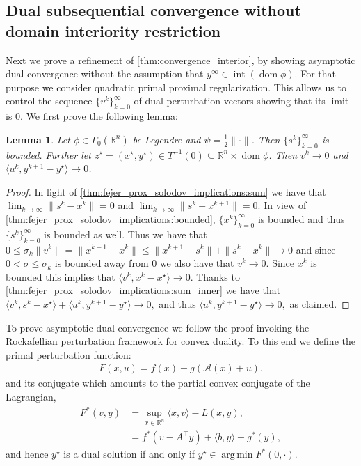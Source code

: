 \documentclass[11pt,onecolumn]{article}
\DeclareMathOperator*{\argmin}{arg\,min}
\DeclareMathOperator{\dom}{dom}
\DeclareMathOperator{\intr}{int}
\newcommand{\bR}{\mathbb{R}}
\newtheorem{lemma}[lemma]{Lemma}
\theoremstyle{remark}
\begin{document}
\subsection{Dual subsequential convergence without domain interiority restriction}
Next we prove a refinement of \cref{thm:convergence_interior}, by showing asymptotic dual convergence without the assumption that $y^\infty \in \intr (\dom \phi)$. For that purpose we consider quadratic primal proximal regularization. This allows us to control the sequence $\{v^k\}_{k=0}^\infty$ of dual perturbation vectors showing that its limit is $0$. We first prove the following lemma:
\begin{lemma} \label{thm:solodov_prox_lemma_alm}
Let $\phi \in \Gamma_0(\bR^n)$ be Legendre and $\psi=\frac{1}{2}\|\cdot\|$. Then $\{s^k\}_{k=0}^\infty$ is bounded.
Further let $z^\star=(x^\star, y^\star) \in T^{-1}(0) \subseteq \bR^n \times \dom \phi$. Then $v^{k} \to 0$ and $\langle u^{k},y^{k+1} - y^\star \rangle \to 0$.
\end{lemma}
\begin{proof}
In light of \cref{thm:fejer_prox_solodov_implications:sum} we have that $\lim_{k\to \infty} \|s^{k} -  x^{k}\|= 0$ and $\lim_{k\to \infty} \|s^{k} -x^{k+1}\|=0$. In view of \cref{thm:fejer_prox_solodov_implications:bounded}, $\{x^k\}_{k=0}^\infty$ is bounded and thus $\{s^k\}_{k=0}^\infty$ is bounded as well.
Thus we have that $0\leq \sigma_k\|v^{k}\|=\|x^{k+1} - x^k\| \leq \|x^{k+1} - s^{k}\| +\| s^{k}- x^k\| \to 0$ and since $0< \sigma \leq \sigma_k$ is bounded away from $0$ we also have that $v^k \to 0$.
Since $x^{k}$ is bounded this implies that $\langle v^{k}, x^{k} - x^\star \rangle \to 0$.
Thanks to \cref{thm:fejer_prox_solodov_implications:sum_inner} we have that 
$
\langle v^{k}, s^{k} - x^\star \rangle + \langle u^{k}, y^{k+1}-y^\star \rangle \to 0,
$
and thus 
$
\langle u^{k}, y^{k+1}-y^\star \rangle \to 0,
$
as claimed.
\end{proof}
To prove asymptotic dual convergence we follow the proof \cite[Proposition 6]{eckstein2003practical} invoking the Rockafellian perturbation framework \cite{RoWe98} for convex duality. To this end we define the primal perturbation function:
\begin{align}
F(x, u)= f(x) + g(\mathcal{A}(x) + u).
\end{align}
and its conjugate which amounts to the partial convex conjugate of the Lagrangian,
\begin{align}
F^*(v,y) &=\sup_{x\in \bR^n} \langle x, v \rangle -L(x,y), \\
&=f^*(v -A^\top y) +\langle b,y \rangle +g^*(y),
\end{align}
and hence $y^\star$ is a dual solution if and only if $y^\star\in \argmin F^*(0, \cdot)$.
\end{document}
